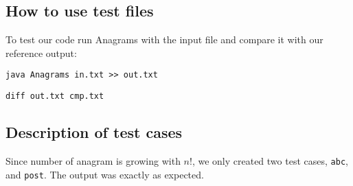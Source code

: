 \documentclass[12pt]{article}
\begin{document}
\subsection{How to use test files}
To test our code run Anagrams with the input file and compare it with our reference output:

\texttt{java Anagrams in.txt >> out.txt}

\texttt{diff\ out.txt\ cmp.txt}


\subsection{Description of test cases}
Since number of anagram is growing with $n! $, we only created two test cases, \texttt{abc}, and \texttt{post}. The output was exactly as expected.

\end{document}
